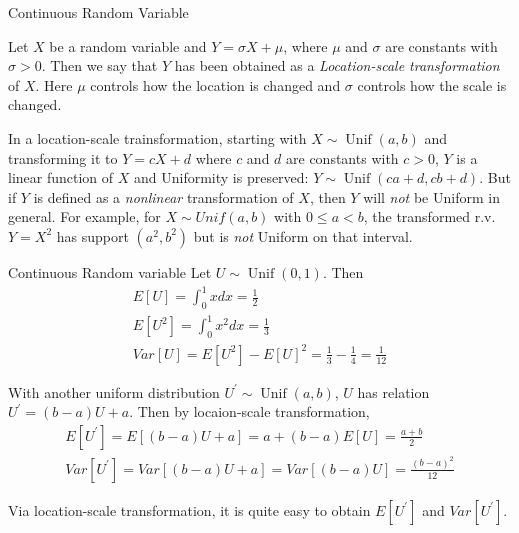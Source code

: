 \documentclass[8pt]{beamer}
\newcommand{\myunif}[2]{\operatorname{Unif}\!\left(#1, #2\right)}
\begin{document}
\begin{frame}{Continuous Random Variable}

    \begin{definition}
        Let $X$ be a random variable and $Y = \sigma X + \mu$, where $\mu$ and $\sigma$ are constants with $\sigma >0$. Then we say that $Y$ has been obtained as a \textit{Location-scale transformation} of $X$. Here $\mu$ controls how the location is changed and $\sigma$ controls how the scale is changed.
    \end{definition}

    \begin{example}
        In a location-scale trainsformation, starting with $X\sim \myunif{a}{b}$ and transforming it to $Y = cX + d$ where $c$ and $d$ are constants with $c >0$, $Y$ is a linear function of $X$ and Uniformity is preserved: $Y \sim \myunif{ca+d}{cb+d}$.  But if $Y$ is defined as a \textit{nonlinear} transformation of $X$, then $Y$ will \textit{not} be Uniform in general. For example, for $X \sim Unif(a,b)$ with $0 \leq a <b$, the transformed r.v. $Y=X^2$ has support $(a^2,b^2)$ but is \textit{not} Uniform on that interval.
    \end{example}



\end{frame}

\begin{frame}{Continuous Random variable}
    Let $U \sim \myunif{0}{1}$. Then 
    \[
    \begin{gathered}
        E[U] = \int_0^1 x dx = \frac{1}{2} \\
        E[U^2] = \int_0^1 x^2 dx = \frac{1}{3} \\
        Var[U] = E[U^2] - E[U]^2 = \frac{1}{3} - \frac{1}{4} = \frac{1}{12} 
    \end{gathered}
    \]
    
    With another uniform distribution $U^\prime \sim \myunif{a}{b}$, $U$ has relation $U^\prime = (b-a)U +a$.
    Then by locaion-scale transformation,
    \[
    \begin{gathered}
        E[U^\prime] = E[(b-a)U+a] = a + (b-a)E[U] = \frac{a+b}{2}\\
        Var[U^\prime] = Var[(b-a)U+a] = Var[(b-a)U] = \frac{(b-a)^2}{12}
    \end{gathered}
    \]

    Via location-scale transformation, it is quite easy to obtain $E[U^\prime]$ and $Var[U^\prime]$.

\end{frame}
\end{document}
